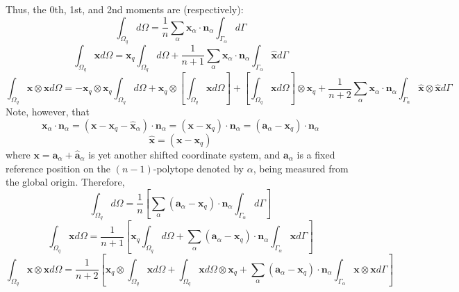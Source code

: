 \documentclass[11pt]{article} %
\begin{document}
Thus, the 0th, 1st, and 2nd moments are (respectively):
\begin{equation}
	\int_{\Omega_q} d \Omega = \frac{1}{n} \sum_{\alpha} \mathbf{x}_{\alpha} \cdot \mathbf{n}_{\alpha} \int_{\Gamma_{\alpha}} d \Gamma
\end{equation}
\begin{equation}
	\int_{\Omega_q} \mathbf{x} d \Omega = \mathbf{x}_q \int_{\Omega_q} d \Omega + \frac{1}{n+1} \sum_{\alpha} \mathbf{x}_{\alpha} \cdot \mathbf{n}_{\alpha} \int_{\Gamma_{\alpha}} \hat{\mathbf{x}} d \Gamma
\end{equation}
\begin{equation}
	\int_{\Omega_q} \mathbf{x} \otimes \mathbf{x} d \Omega = - \mathbf{x}_q \otimes \mathbf{x}_q \int_{\Omega_q} d \Omega + \mathbf{x}_q \otimes \left[ \int_{\Omega_q} \mathbf{x} d \Omega \right] + \left[ \int_{\Omega_q} \mathbf{x} d \Omega \right] \otimes \mathbf{x}_q + \frac{1}{n+2} \sum_{\alpha} \mathbf{x}_{\alpha} \cdot \mathbf{n}_{\alpha} \int_{\Gamma_{\alpha}} \hat{\mathbf{x}} \otimes \hat{\mathbf{x}} d \Gamma
\end{equation}
Note, however, that
\begin{equation}
	\mathbf{x}_{\alpha} \cdot \mathbf{n}_{\alpha} = (\mathbf{x} - \mathbf{x}_q - \hat{\mathbf{x}}_{\alpha}) \cdot \mathbf{n}_{\alpha} = (\mathbf{x} - \mathbf{x}_q) \cdot \mathbf{n}_{\alpha} =  (\mathbf{a}_{\alpha} - \mathbf{x}_q) \cdot \mathbf{n}_{\alpha}
\end{equation}
\begin{equation}
	\hat{\mathbf{x}} = (\mathbf{x} - \mathbf{x}_q)
\end{equation}
where $\mathbf{x} = \mathbf{a}_{\alpha} + \hat{\mathbf{a}}_{\alpha}$ is yet another shifted coordinate system, and $\mathbf{a}_{\alpha}$ is a fixed reference position on the $(n-1)$-polytope denoted by $\alpha$, being measured from the global origin. Therefore,
\begin{equation}
	\int_{\Omega_q} d \Omega = \frac{1}{n} \left[ \sum_{\alpha} (\mathbf{a}_{\alpha} - \mathbf{x}_q) \cdot \mathbf{n}_{\alpha} \int_{\Gamma_{\alpha}} d \Gamma \right]
\end{equation}
\begin{equation}
	\int_{\Omega_q} \mathbf{x} d \Omega = \frac{1}{n+1} \left[ \mathbf{x}_q \int_{\Omega_q} d \Omega + \sum_{\alpha} (\mathbf{a}_{\alpha} - \mathbf{x}_q) \cdot \mathbf{n}_{\alpha} \int_{\Gamma_{\alpha}} \mathbf{x} d \Gamma \right]
\end{equation}
\begin{equation}
	\int_{\Omega_q} \mathbf{x} \otimes \mathbf{x} d \Omega = \frac{1}{n+2} \left[ \mathbf{x}_q \otimes \int_{\Omega_q} \mathbf{x} d \Omega + \int_{\Omega_q} \mathbf{x} d \Omega \otimes \mathbf{x}_q + \sum_{\alpha} (\mathbf{a}_{\alpha} - \mathbf{x}_q) \cdot \mathbf{n}_{\alpha} \int_{\Gamma_{\alpha}} \mathbf{x} \otimes \mathbf{x} d \Gamma \right]
\end{equation}
\end{document}
